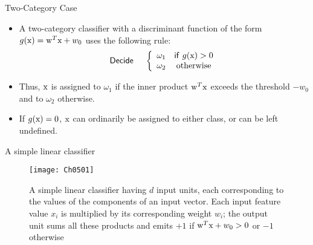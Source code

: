 \subsection{}
\begin{frame}{Two-Category Case}
\begin{itemize}
\setlength{\itemsep}{12pt}
\item A two-category classifier with a discriminant function of the form $g({\rm x})={\rm w}^T{\rm x}+w_0$ uses the following rule:\\
\begin{equation}
{\sf Decide}~~~~\left\{ {\begin{array}{*{20}{c}}
{{\omega_1}}&{{\sf if}~g({\rm x}) > 0}\\
{{\omega_2}}&{\rm otherwise}
\end{array}} \right.\nonumber
\end{equation}
\item Thus, ${\rm x}$ is assigned to $\omega_1$ if the {\color{mycolor2}inner product} ${\rm w}^T{\rm x}$ exceeds the
threshold $-w_0$ and to $\omega_2$ otherwise.
\item If $g({\rm x})=0$, ${\rm x}$ can ordinarily be assigned to either class, or can be left undefined.
\end{itemize}
\end{frame}

\begin{frame}{A simple linear classifier}
\begin{figure}
\texttt{[image: Ch0501]}
\caption{A simple linear classifier having $d$ input units, each corresponding to the values of the components of an input vector. Each input feature value $x_i$ is multiplied by its corresponding weight $w_i$; the output unit sums all these products and emits $+1$ if ${\rm w}^T{\rm x}+w_0>0$ or $-1$ otherwise}
\end{figure}
\end{frame}

